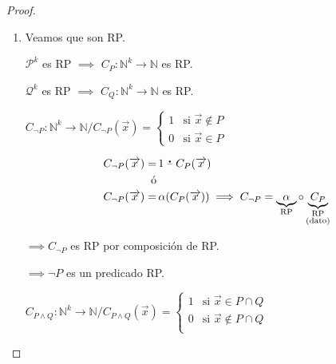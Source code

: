 \begin{proof} \phantom{.}
    \begin{enumerate}
        \item Veamos que son RP.

            $\mathcal{P}^k$ es RP $\implies$ 
            $C_{{P}}: \mathbb{N}^k \to \mathbb{N}$ es RP.

            $\mathcal{Q}^k$ es RP $\implies$ 
            $C_{Q}: \mathbb{N}^k \to \mathbb{N}$ es RP.

            $C_{\neg P}: \mathbb{N}^k \to \mathbb{N} /
            C_{\neg P} (\overrightarrow{x}) = 
            \begin{cases}
                1 & \text{si } \overrightarrow{x} \notin {P} \\
                0 & \text{si } \overrightarrow{x} \in {P}
            \end{cases}$

            \begin{align*}
                C_{\neg P} (\overrightarrow{x}) =& \, 
                1 \;\accentset{\mbox{\large\bfseries .}}{\text{--}}\; C_{P}(\overrightarrow{x})\\
                \text{ó}& \\
                C_{\neg P} (\overrightarrow{x}) =& \,
                \alpha(C_{P}(\overrightarrow{x})) \implies C_{\neg P} 
                = \underbrace{\alpha}_{\text{RP}} \circ 
            \underbrace{C_P}_{\substack{\text{RP}\\ \text{(dato)}}}
            \end{align*}

            $\implies C_{\neg P}$ es RP por composición de RP.

            $\implies \neg P$ es un predicado RP.


            $C_{P \wedge Q}: \mathbb{N}^k \to \mathbb{N} /
            C_{P \wedge Q} (\overrightarrow{x}) = 
            \begin{cases}
                1 & \text{si } \overrightarrow{x} \in 
                P \cap Q \\
                0 & \text{si } \overrightarrow{x} \notin
                P \cap Q \\
            \end{cases}$


\end{enumerate}
\end{proof}
